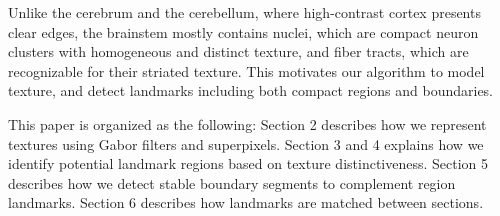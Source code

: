 \documentclass{llncs}
\begin{document}





Unlike the cerebrum and the cerebellum, where high-contrast cortex presents clear edges, the brainstem mostly contains nuclei, which are compact neuron clusters with homogeneous and distinct texture, and
fiber tracts, which are recognizable for their striated texture. 
This motivates our algorithm to model texture, and detect landmarks including both compact regions and boundaries.

This paper is organized as the following: Section 2 describes how we represent textures using Gabor filters and superpixels. Section 3 and 4 explains how we identify potential landmark regions based on texture distinctiveness. Section 5 describes how we detect stable boundary segments to complement region landmarks. Section 6 describes how landmarks are matched between sections.
\end{document}
